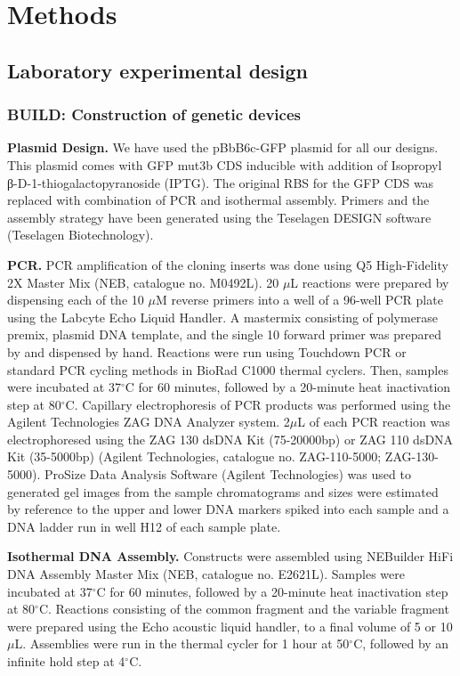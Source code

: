 \section{Methods}

\subsection{Laboratory experimental design}

\subsubsection{BUILD: Construction of genetic devices}

\textbf{Plasmid Design.}
We have used the pBbB6c-GFP plasmid for all our designs.
This plasmid comes with GFP mut3b CDS inducible with addition of Isopropyl β-D-1-thiogalactopyranoside (IPTG).
The original RBS for the GFP CDS was replaced with combination of PCR and isothermal assembly.
Primers and the assembly strategy have been generated using the Teselagen DESIGN software (Teselagen Biotechnology).

\textbf{PCR.}
PCR amplification of the cloning inserts was done using Q5 High-Fidelity 2X Master Mix (NEB, catalogue no. M0492L).
20 $\mu$L reactions were prepared by dispensing each of the 10 $\mu$M reverse primers into a well of a 96-well PCR plate using the Labcyte Echo Liquid Handler.
A mastermix consisting of polymerase premix, plasmid DNA template, and the single 10 forward primer was prepared by and dispensed by hand. Reactions were run using Touchdown PCR or standard PCR cycling methods in BioRad C1000 thermal cyclers.
Then, samples were incubated at 37$^{\circ}$C for 60 minutes, followed by a 20-minute heat inactivation step at 80$^{\circ}$C.
Capillary electrophoresis of PCR products was performed using the Agilent Technologies ZAG DNA Analyzer system.
2$\mu$L of each PCR reaction was electrophoresed using the ZAG 130 dsDNA Kit (75-20000bp) or ZAG 110 dsDNA Kit (35-5000bp) (Agilent Technologies, catalogue no. ZAG-110-5000; ZAG-130-5000).
ProSize Data Analysis Software (Agilent Technologies) was used to generated gel images from the sample chromatograms and sizes were estimated by reference to the upper and lower DNA markers spiked into each sample and a DNA ladder run in well H12 of each sample plate. 

\textbf{Isothermal DNA Assembly.}
Constructs were assembled using NEBuilder HiFi DNA Assembly Master Mix (NEB, catalogue no. E2621L).
Samples were incubated at 37$^{\circ}$C for 60 minutes, followed by a 20-minute heat inactivation step at 80$^{\circ}$C.
Reactions consisting of the common fragment and the variable fragment were prepared using the Echo acoustic liquid handler, to a final volume of 5 or 10\(\mu\)L.
Assemblies were run in the thermal cycler for 1 hour at 50$^{\circ}$C, followed by an infinite hold step at 4$^{\circ}$C.

